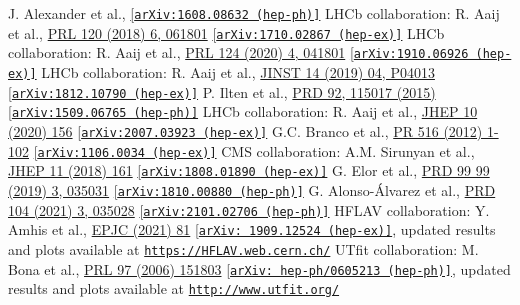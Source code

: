 \documentclass[a4paper,11pt]{article}
\begin{document}
\begin{thebibliography}{99}
J. Alexander et al., \href{https://arxiv.org/abs/1608.08632}{[\tt arXiv:1608.08632 (hep-ph)]}
LHCb collaboration: R. Aaij et al., \href{https://doi.org/10.1103/PhysRevLett.120.061801}{PRL 120 (2018) 6, 061801} \href{https://arxiv.org/abs/1710.02867}{[\tt arXiv:1710.02867 (hep-ex)]}
LHCb collaboration: R. Aaij et al., \href{https://doi.org/10.1103/PhysRevLett.124.041801}{PRL 124 (2020) 4, 041801} \href{https://arxiv.org/abs/1910.06926}{[\tt arXiv:1910.06926 (hep-ex)]}
LHCb collaboration: R. Aaij et al., \href{https://doi.org/10.1088/1748-0221/14/04/P04013}{JINST 14 (2019) 04, P04013} \href{https://arxiv.org/abs/1812.10790}{[\tt arXiv:1812.10790 (hep-ex)]}
P. Ilten et al., \href{https://doi.org/10.1103/PhysRevD.92.115017}{PRD 92, 115017 (2015)} \href{https://arxiv.org/abs/1509.06765}{[\tt arXiv:1509.06765 (hep-ph)]}
LHCb collaboration: R. Aaij et al., \href{https://doi.org/10.1007/JHEP10(2020)156}{    JHEP 10 (2020) 156} \href{https://arxiv.org/abs/2007.03923}{[\tt arXiv:2007.03923 (hep-ex)]}
G.C. Branco et al., \href{https://doi.org/10.1016/j.physrep.2012.02.002}{PR 516 (2012) 1-102} \href{https://arxiv.org/abs/1106.0034}{[\tt arXiv:1106.0034 (hep-ex)]}
CMS collaboration:     A.M. Sirunyan et al., \href{https://doi.org/10.1007/JHEP11(2018)161}{    JHEP 11 (2018) 161} \href{https://arxiv.org/abs/1808.01890}{[\tt arXiv:1808.01890 (hep-ex)]}
G. Elor et al., \href{https://doi.org/10.1103/PhysRevD.99.035031}{PRD 99 99 (2019) 3, 035031} \href{https://arxiv.org/abs/1810.00880}{[\tt arXiv:1810.00880 (hep-ph)]}
G. Alonso-Álvarez et al., \href{https://doi.org/10.1103/PhysRevD.104.035028}{PRD 104 (2021) 3, 035028} \href{https://arxiv.org/abs/2101.02706}{[\tt arXiv:2101.02706 (hep-ph)]}
HFLAV collaboration: Y. Amhis et al., \href{https://doi.org/10.1140/epjc/s10052-020-8156-7}{EPJC (2021) 81} \href{https://arxiv.org/abs/1909.12524}{[\tt arXiv: 1909.12524 (hep-ex)]}, updated results and plots available at \href{https://HFLAV.web.cern.ch/}{{\texttt{https://HFLAV.web.cern.ch/}}}
UTfit collaboration: M. Bona et al., \href{https://doi.org/10.1103/PhysRevLett.97.151803}{PRL 97 (2006) 151803} \href{https://arxiv.org/abs/hep-ph/0605213}{[\tt arXiv: hep-ph/0605213 (hep-ph)]}, updated results and plots available at \href{http://www.utfit.org/UTfit/WebHome}{{\texttt{http://www.utfit.org/}}}

\end{thebibliography}
\end{document}
